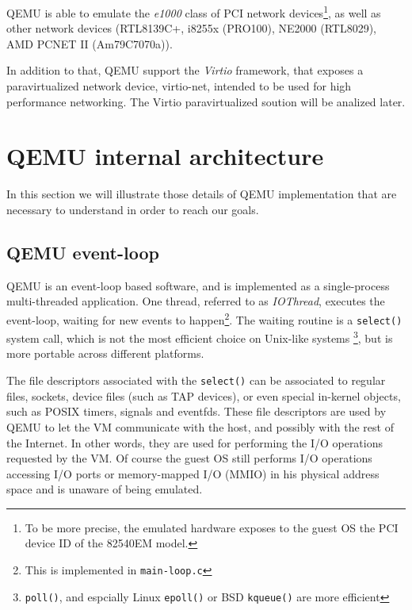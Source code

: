 QEMU is able to emulate the \emph{e1000} class of PCI network devices\footnote{To be more precise, the emulated hardware exposes
to the guest OS the PCI device ID of the 82540EM model.}, as well as other network devices (RTL8139C+, i8255x (PRO100), 
NE2000 (RTL8029), AMD PCNET II (Am79C7070a)).

In addition to that, QEMU support the \emph{Virtio} framework, that exposes a paravirtualized network device, virtio-net, intended 
to be used for high performance networking. The Virtio paravirtualized soution will be analized later.



\section{QEMU internal architecture}
In this section we will illustrate those details of QEMU implementation that are necessary to understand in order to reach our
goals.

\subsection{QEMU event-loop}
QEMU is an event-loop based software, and is implemented as a single-process multi-threaded application. 
One thread, referred to as \emph{IOThread}, executes the event-loop, waiting for new events to happen\footnote{This is 
implemented in \texttt{main-loop.c}}.
The waiting routine is a \texttt{select()} system call, which is not the most efficient choice on Unix-like systems
\footnote{ \texttt{poll()}, and espcially Linux \texttt{epoll()} or BSD \texttt{kqueue()} are more efficient},
but is more portable across different platforms.

\vspace{0.5cm}

The file descriptors associated with the \texttt{select()} can be associated to regular files, sockets, device files (such as TAP 
devices), or even special in-kernel objects, such as POSIX timers, signals and eventfds. These file descriptors are used by QEMU to let
the VM communicate with the host, and possibly with the rest of the Internet. In other words, they are used for performing the I/O 
operations requested by the VM. Of course the guest OS still performs I/O operations accessing I/O ports or memory-mapped I/O (MMIO) in 
his physical address space and is unaware of being emulated.

\vspace{0.5cm}

